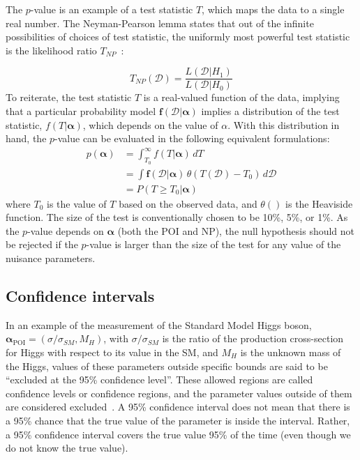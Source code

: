 The $p$-value is an example of a test statistic $T$, which maps the data to a single real number. The Neyman-Pearson lemma states that out of the infinite possibilities of choices of test statistic, the uniformly most powerful test statistic is the likelihood ratio $T_{NP}$~\cite{2011-Statistics-Cranmer}:

\begin{equation}
    T_{NP}(\mathcal{D}) = \frac{L(\mathcal{D} | {H_1})}{L(\mathcal{D}|{H_0})}
\end{equation}
To reiterate, the test statistic $T$ is a real-valued function of the data, implying that a particular probability model $\boldsymbol{f}(\mathcal{D}|\boldsymbol{\alpha})$ implies a distribution of the test statistic, $f(T|\boldsymbol{\alpha})$, which depends on the value of $\alpha$. With this distribution in hand, the $p$-value can be evaluated in the following equivalent formulations:
\begin{align}
    p(\boldsymbol{\alpha}) &= \int_{T_0}^{\infty} f(T|\boldsymbol{\alpha}) \, dT  \\
              &= \int \boldsymbol{f}(\mathcal{D} | \boldsymbol{\alpha}) \, \theta(T(\mathcal{D}) - T_0) \, d\mathcal{D} \\
              &= P(T \geq T_0 | \boldsymbol{\alpha})
\end{align}
where $T_0$ is the value of $T$ based on the observed data, and $\theta()$ is the Heaviside function. The size of the test is conventionally chosen to be 10\%, 5\%, or 1\%. As the $p$-value depends on $\boldsymbol{\alpha}$ (both the POI and NP), the null hypothesis should not be rejected if the $p$-value is larger than the size of the test for any value of the nuisance parameters.

\subsection{Confidence intervals}
In an example of the measurement of the Standard Model Higgs boson, $\boldsymbol{\alpha}_{\text{POI}} = (\sigma/ \sigma_{SM}, M_H)$, with $\sigma/\sigma_{SM}$ is the ratio of the production cross-section for Higgs with respect to its value in the SM, and $M_H$ is the unknown mass of the Higgs, values of these parameters outside specific bounds are said to be ``excluded at the 95\% confidence level''. These allowed regions are called confidence levels or confidence regions, and the parameter values outside of them are considered excluded~\cite{2011-Statistics-Cranmer}. A 95\% confidence interval does not mean that there is a 95\% chance that the true value of the parameter is inside the interval. Rather, a 95\% confidence interval covers the true value 95\% of the time (even though we do not know the true value). 

